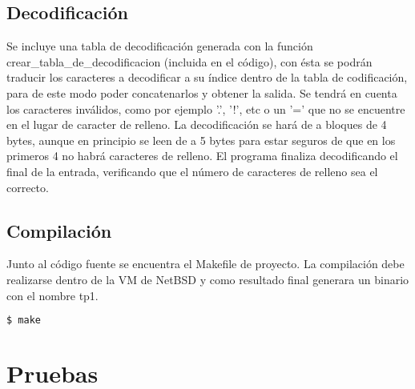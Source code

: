 \documentclass[a4paper,11pt, margin=1in]{article}
\begin{document}
	

\subsection{Decodificación}
Se incluye una tabla de decodificación generada con la función crear\_tabla\_de\_decodificacion (incluida en el código), 
con ésta se podrán traducir los caracteres a decodificar a su índice dentro de la tabla de codificación, 
para de este modo poder concatenarlos y obtener la salida. Se tendrá en cuenta los caracteres inválidos, 
como por ejemplo '.', '!', etc o un '=' que no se encuentre en el lugar de caracter de relleno.
La decodificación se hará de a bloques de 4 bytes, aunque en principio se leen de a 5 bytes para estar 
seguros de que en los primeros 4 no habrá caracteres de relleno. 
El programa finaliza decodificando el final de la entrada, verificando que el número de caracteres de relleno 
sea el correcto.


\subsection{Compilación}
Junto al código fuente se encuentra el Makefile de proyecto. La compilación debe realizarse dentro de la VM de NetBSD y
como resultado final generara un binario con el nombre tp1.

\begin{lstlisting}[language=bash,frame=\tiny]
$ make
\end{lstlisting}

\section{Pruebas}
\end{document}
